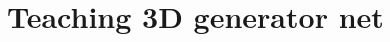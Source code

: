\documentclass[10pt,twocolumn,letterpaper]{article}
\begin{document}
%
%

\section{Teaching 3D generator net}
\end{document}
